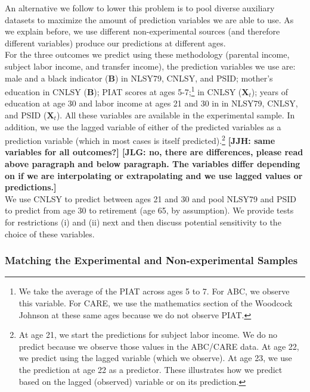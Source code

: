 \noindent An alternative we follow to lower this problem is to pool diverse auxiliary datasets to maximize the amount of prediction variables we are able to use. As we explain before, we use different non-experimental sources (and therefore different variables) produce our predictions at different ages.\\

\noindent For the three outcomes we predict using these methodology (parental income, subject labor income, and transfer income), the prediction variables we use are: male and a black indicator ($\bm{B}$) in NLSY79, CNLSY, and PSID; mother's education in CNLSY ($\bm{B}$); PIAT scores at ages 5-7;\footnote{We take the average of the PIAT across ages 5 to 7. For ABC, we observe this variable. For CARE, we use the mathematics section of the Woodcock Johnson at these same ages because we do not observe PIAT.} in CNLSY ($\bm{X}_{t}$); years of education at age 30 and labor income at ages 21 and 30 in in NLSY79, CNLSY, and PSID ($\bm{X}_{t}$). All these variables are available in the experimental sample. In addition, we use the lagged variable of either of the predicted variables as a prediction variable (which in most cases is itself predicted).\footnote{At age 21, we start the predictions for subject labor income. We do no predict because we observe those values in the ABC/CARE data. At age 22, we predict using the lagged variable (which we observe). At age 23, we use the prediction at age 22 as a predictor. These illustrates how we predict based on the lagged (observed) variable or on its prediction.} \textbf{[JJH: same variables for all outcomes?] [JLG: no, there are differences, please read above paragraph and below paragraph. The variables differ depending on if we are interpolating or extrapolating and we use lagged values or predictions.]}\\

\noindent We use CNLSY to predict between ages 21 and 30 and pool NLSY79 and PSID to predict from age 30 to retirement (age 65, by assumption). We provide tests for restrictions (i) and (ii) next and then discuss potential sensitivity to the choice of these variables.

\subsubsection{Matching the Experimental and Non-experimental Samples} \label{appendix:match}

